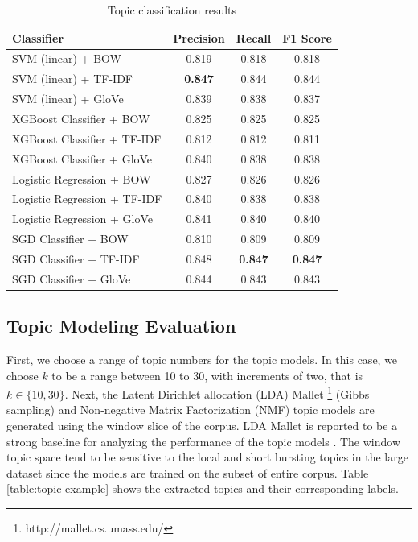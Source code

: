 \begin{table}[!ht]
  \centering
  \caption{Topic classification results}
  \label{tab:classificationresults}
  \begin{tabular}{lccc}
    \toprule
    Classifier & Precision & Recall & F1 Score \\
    \midrule
    SVM (linear) + BOW                             & 0.819     & 0.818  & 0.818    \\ 
    SVM (linear) + TF-IDF                          & \textbf{0.847}     & 0.844  & 0.844    \\ 
    SVM (linear) + GloVe                           & 0.839     & 0.838  & 0.837    \\ 
    \midrule
    XGBoost Classifier + BOW               & 0.825     & 0.825  & 0.825    \\ 
    XGBoost Classifier + TF-IDF            & 0.812     & 0.812  & 0.811    \\ 
    XGBoost Classifier + GloVe             & 0.840     & 0.838  & 0.838    \\ 
    \midrule
    Logistic Regression + BOW              & 0.827     & 0.826  & 0.826    \\ 
    Logistic Regression + TF-IDF           & 0.840     & 0.838  & 0.838    \\ 
    Logistic Regression + GloVe            & 0.841     & 0.840  & 0.840    \\ 
    \midrule
    SGD Classifier + BOW                  & 0.810     & 0.809  & 0.809    \\ 
    SGD Classifier + TF-IDF               & 0.848     & \textbf{0.847}  & \textbf{0.847}    \\ 
    SGD Classifier + GloVe                & 0.844     & 0.843  & 0.843    \\ 
    \midrule
    \bottomrule
  \end{tabular}
\end{table}



\subsection{Topic Modeling Evaluation}

First, we choose a range of topic numbers for the topic models. In this case, we choose $k$ to be a range between 10 to 30, with increments of two, that is $k \in \{10, 30\}$. Next, the Latent Dirichlet allocation (LDA) Mallet \footnote{http://mallet.cs.umass.edu/} (Gibbs sampling) and Non-negative Matrix Factorization (NMF) topic models are generated using the window slice of the corpus. LDA Mallet is reported to be a strong baseline for analyzing the performance of the topic models \cite{Greene2016}. The window topic space tend to be sensitive to the local and short bursting topics in the large dataset since the models are trained on the subset of entire corpus. Table \ref{table:topic-example} shows the extracted topics and their corresponding labels.

